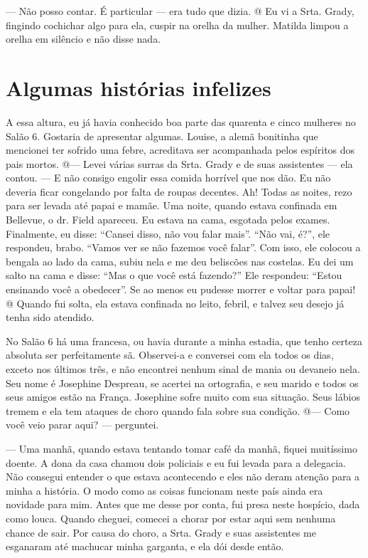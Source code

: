 --- Não posso contar. É particular --- era tudo que dizia. @ Eu vi a
Srta. Grady, fingindo cochichar algo para ela, cuspir na orelha da
mulher. Matilda limpou a orelha em silêncio e não disse nada.

\label{section-8}

\chapter{Algumas histórias
infelizes}\label{capuxedtulo-xiv-algumas-histuxf3rias-infelizes}

A essa altura, eu já havia conhecido boa parte das quarenta e cinco
mulheres no Salão 6. Gostaria de apresentar algumas. Louise, a alemã
bonitinha que mencionei ter sofrido uma febre, acreditava ser
acompanhada pelos espíritos dos pais mortos. @--- Levei várias surras da
Srta. Grady e de suas assistentes --- ela contou. --- E não consigo
engolir essa comida horrível que nos dão. Eu não deveria ficar
congelando por falta de roupas decentes. Ah! Todas as noites, rezo para
ser levada até papai e mamãe. Uma noite, quando estava confinada em
Bellevue, o dr. Field apareceu. Eu estava na cama, esgotada pelos
exames. Finalmente, eu disse: ``Cansei disso, não vou falar mais''.
``Não vai, é?'', ele respondeu, brabo. ``Vamos ver se não fazemos você
falar''. Com isso, ele colocou a bengala ao lado da cama, subiu nela e
me deu beliscões nas costelas. Eu dei um salto na cama e disse: ``Mas o
que você está fazendo?'' Ele respondeu: ``Estou ensinando você a
obedecer''. Se ao menos eu pudesse morrer e voltar para papai! @ Quando
fui solta, ela estava confinada no leito, febril, e talvez seu desejo já
tenha sido atendido.

No Salão 6 há uma francesa, ou havia durante a minha estadia, que tenho
certeza absoluta ser perfeitamente sã. Observei-a e conversei com ela
todos os dias, exceto nos últimos três, e não encontrei nenhum sinal de
mania ou devaneio nela. Seu nome é Josephine Despreau, se acertei na
ortografia, e seu marido e todos os seus amigos estão na França.
Josephine sofre muito com sua situação. Seus lábios tremem e ela tem
ataques de choro quando fala sobre sua condição. @--- Como você veio
parar aqui? --- perguntei.

--- Uma manhã, quando estava tentando tomar café da manhã, fiquei
muitíssimo doente. A dona da casa chamou dois policiais e eu fui levada
para a delegacia. Não consegui entender o que estava acontecendo e eles
não deram atenção para a minha a história. O modo como as coisas
funcionam neste país ainda era novidade para mim. Antes que me desse por
conta, fui presa neste hospício, dada como louca. Quando cheguei,
comecei a chorar por estar aqui sem nenhuma chance de sair. Por causa do
choro, a Srta. Grady e suas assistentes me esganaram até machucar minha
garganta, e ela dói desde então.

